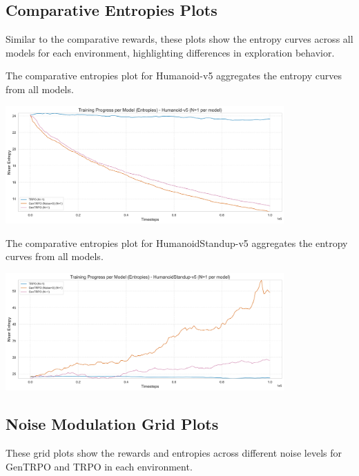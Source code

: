 \documentclass{svproc}
\begin{document}
\subsection{Comparative Entropies Plots}
Similar to the comparative rewards, these plots show the entropy curves across all models for each environment, highlighting differences in exploration behavior.

The comparative entropies plot for Humanoid-v5 aggregates the entropy curves from all models.

\begin{center}
\includegraphics[width=0.8\textwidth]{graph_Humanoid-v5_models_entropies.png}
\end{center}

The comparative entropies plot for HumanoidStandup-v5 aggregates the entropy curves from all models.

\begin{center}
\includegraphics[width=0.8\textwidth]{graph_HumanoidStandup-v5_models_entropies.png}
\end{center}

\subsection{Noise Modulation Grid Plots}
These grid plots show the rewards and entropies across different noise levels for GenTRPO and TRPO in each environment.
\end{document}

